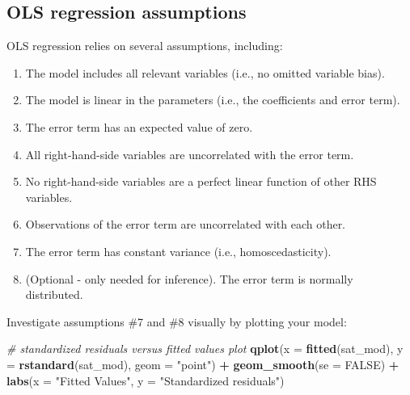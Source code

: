 \documentclass[
]{book}
\newenvironment{Shaded}{\begin{snugshade}}{\end{snugshade}}
\newcommand{\CommentTok}[1]{\textcolor[rgb]{0.56,0.35,0.01}{\textit{#1}}}
\newcommand{\DataTypeTok}[1]{\textcolor[rgb]{0.13,0.29,0.53}{#1}}
\newcommand{\KeywordTok}[1]{\textcolor[rgb]{0.13,0.29,0.53}{\textbf{#1}}}
\newcommand{\NormalTok}[1]{#1}
\newcommand{\OperatorTok}[1]{\textcolor[rgb]{0.81,0.36,0.00}{\textbf{#1}}}
\newcommand{\OtherTok}[1]{\textcolor[rgb]{0.56,0.35,0.01}{#1}}
\newcommand{\StringTok}[1]{\textcolor[rgb]{0.31,0.60,0.02}{#1}}
\providecommand{\tightlist}{%
  \setlength{\itemsep}{0pt}\setlength{\parskip}{0pt}}
\begin{document}
\hypertarget{ols-regression-assumptions}{%
\subsection{OLS regression assumptions}\label{ols-regression-assumptions}}

OLS regression relies on several assumptions, including:

\begin{enumerate}
\def\labelenumi{\arabic{enumi}.}
\tightlist
\item
  The model includes all relevant variables (i.e., no omitted variable bias).
\item
  The model is linear in the parameters (i.e., the coefficients and error term).
\item
  The error term has an expected value of zero.
\item
  All right-hand-side variables are uncorrelated with the error term.
\item
  No right-hand-side variables are a perfect linear function of other RHS variables.
\item
  Observations of the error term are uncorrelated with each other.
\item
  The error term has constant variance (i.e., homoscedasticity).
\item
  (Optional - only needed for inference). The error term is normally distributed.
\end{enumerate}

Investigate assumptions \#7 and \#8 visually by plotting your model:

\begin{Shaded}
\begin{Highlighting}[]
  \CommentTok{\# standardized residuals versus fitted values plot}
  \KeywordTok{qplot}\NormalTok{(}\DataTypeTok{x =} \KeywordTok{fitted}\NormalTok{(sat\_mod), }\DataTypeTok{y =} \KeywordTok{rstandard}\NormalTok{(sat\_mod), }\DataTypeTok{geom =} \StringTok{"point"}\NormalTok{) }\OperatorTok{+}
\StringTok{      }\KeywordTok{geom\_smooth}\NormalTok{(}\DataTypeTok{se =} \OtherTok{FALSE}\NormalTok{) }\OperatorTok{+}
\StringTok{      }\KeywordTok{labs}\NormalTok{(}\DataTypeTok{x =} \StringTok{"Fitted Values"}\NormalTok{, }\DataTypeTok{y =} \StringTok{"Standardized residuals"}\NormalTok{)}
\end{Highlighting}
\end{Shaded}
\end{document}
